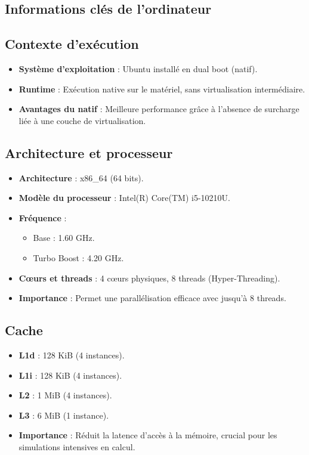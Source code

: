 \documentclass[a4paper,13pt]{book}
\begin{document}
\clearpage
\subsection{Informations clés de l'ordinateur}

\subsection*{Contexte d'exécution}
\begin{itemize}[leftmargin=*]
    \item \textbf{Système d'exploitation} : Ubuntu installé en dual boot (natif).
    \item \textbf{Runtime} : Exécution native sur le matériel, sans virtualisation intermédiaire.
    \item \textbf{Avantages du natif} : Meilleure performance grâce à l'absence de surcharge liée à une couche de virtualisation.
\end{itemize}

\subsection*{Architecture et processeur}
\begin{itemize}[leftmargin=*]
    \item \textbf{Architecture} : x86\_64 (64 bits).
    \item \textbf{Modèle du processeur} : Intel(R) Core(TM) i5-10210U.
    \item \textbf{Fréquence} :
        \begin{itemize}
            \item Base : 1.60 GHz.
            \item Turbo Boost : 4.20 GHz.
        \end{itemize}
    \item \textbf{Cœurs et threads} : 4 cœurs physiques, 8 threads (Hyper-Threading).
    \item \textbf{Importance} : Permet une parallélisation efficace avec jusqu'à 8 threads.
\end{itemize}

\subsection*{Cache}
\begin{itemize}[leftmargin=*]
    \item \textbf{L1d} : 128 KiB (4 instances).
    \item \textbf{L1i} : 128 KiB (4 instances).
    \item \textbf{L2} : 1 MiB (4 instances).
    \item \textbf{L3} : 6 MiB (1 instance).
    \item \textbf{Importance} : Réduit la latence d'accès à la mémoire, crucial pour les simulations intensives en calcul.
\end{itemize}
\clearpage
\end{document}
